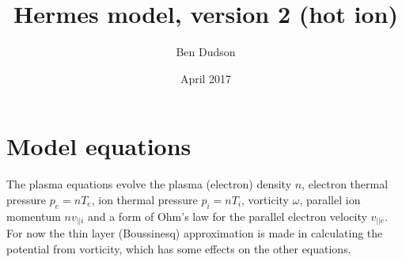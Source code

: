 \documentclass[12pt,a4paper]{article}
\title{ Hermes model, version 2 (hot ion) }%
\author{ Ben Dudson }%
\date{ April 2017 }%
\begin{document}
\maketitle %
\thispagestyle{fancy}%

\section{Model equations}

The plasma equations evolve the plasma (electron) density $n$, electron thermal pressure $p_e = nT_e$, ion thermal pressure
$p_i=nT_i$, vorticity $\omega$, parallel ion momentum $nv_{||i}$ and a form of Ohm's law for the parallel electron velocity $v_{||e}$. For now the thin layer (Boussinesq) approximation
is made in calculating the potential from vorticity, which has some effects on the other equations.
\end{document}
